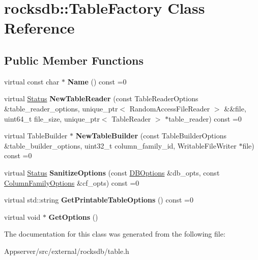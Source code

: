 \hypertarget{classrocksdb_1_1TableFactory}{}\section{rocksdb\+:\+:Table\+Factory Class Reference}
\label{classrocksdb_1_1TableFactory}
\subsection*{Public Member Functions}
\begin{DoxyCompactItemize}
\item 
virtual const char $\ast$ {\bfseries Name} () const =0\hypertarget{classrocksdb_1_1TableFactory_a0192ae8ed07500d334d7487ed2c9cd38}{}\label{classrocksdb_1_1TableFactory_a0192ae8ed07500d334d7487ed2c9cd38}

\item 
virtual \hyperlink{classrocksdb_1_1Status}{Status} {\bfseries New\+Table\+Reader} (const Table\+Reader\+Options \&table\+\_\+reader\+\_\+options, unique\+\_\+ptr$<$ Random\+Access\+File\+Reader $>$ \&\&file, uint64\+\_\+t file\+\_\+size, unique\+\_\+ptr$<$ Table\+Reader $>$ $\ast$table\+\_\+reader) const =0\hypertarget{classrocksdb_1_1TableFactory_a005c3da6f888bc9b7157fa62012b86c5}{}\label{classrocksdb_1_1TableFactory_a005c3da6f888bc9b7157fa62012b86c5}

\item 
virtual Table\+Builder $\ast$ {\bfseries New\+Table\+Builder} (const Table\+Builder\+Options \&table\+\_\+builder\+\_\+options, uint32\+\_\+t column\+\_\+family\+\_\+id, Writable\+File\+Writer $\ast$file) const =0\hypertarget{classrocksdb_1_1TableFactory_a8d6bcacd3d71ded411450cf67e32e7db}{}\label{classrocksdb_1_1TableFactory_a8d6bcacd3d71ded411450cf67e32e7db}

\item 
virtual \hyperlink{classrocksdb_1_1Status}{Status} {\bfseries Sanitize\+Options} (const \hyperlink{structrocksdb_1_1DBOptions}{D\+B\+Options} \&db\+\_\+opts, const \hyperlink{structrocksdb_1_1ColumnFamilyOptions}{Column\+Family\+Options} \&cf\+\_\+opts) const =0\hypertarget{classrocksdb_1_1TableFactory_a1ce4350fa9f0bdf63dbb63b5db79ad74}{}\label{classrocksdb_1_1TableFactory_a1ce4350fa9f0bdf63dbb63b5db79ad74}

\item 
virtual std\+::string {\bfseries Get\+Printable\+Table\+Options} () const =0\hypertarget{classrocksdb_1_1TableFactory_abf7768646a0e98df1a39e3cad2b794e2}{}\label{classrocksdb_1_1TableFactory_abf7768646a0e98df1a39e3cad2b794e2}

\item 
virtual void $\ast$ {\bfseries Get\+Options} ()\hypertarget{classrocksdb_1_1TableFactory_a91fd699d5e1bcf2acdcdeef91874d7ac}{}\label{classrocksdb_1_1TableFactory_a91fd699d5e1bcf2acdcdeef91874d7ac}

\end{DoxyCompactItemize}


The documentation for this class was generated from the following file\+:\begin{DoxyCompactItemize}
\item 
Appserver/src/external/rocksdb/table.\+h\end{DoxyCompactItemize}
